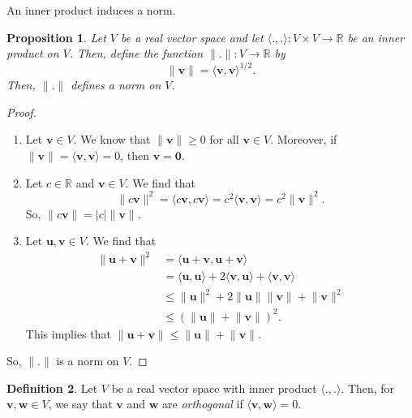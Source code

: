 \documentclass[a4paper, openany]{memoir}
\theoremstyle{definition}
\newtheorem{definition}{Definition}[section]
\theoremstyle{plain}
\newtheorem{proposition}[definition]{Proposition}
\begin{document}
An inner product induces a norm.
\begin{proposition}
    Let $V$ be a real vector space and let $\langle ., . \rangle: V \times V \to \mathbb{R}$ be an inner product on $V$. Then, define the function $\lVert . \rVert: V \to \mathbb{R}$ by 
    \[\lVert \bm{v} \rVert = \langle \bm{v}, \bm{v} \rangle^{1/2}.\]
    Then, $\lVert . \rVert$ defines a norm on $V$.
\end{proposition}
\begin{proof}
    \hspace*{0pt}
    \begin{enumerate}[label=\textbf{N\arabic*.}]
        \item Let $\bm{v} \in V$. We know that $\lVert \bm{v} \rVert \geq 0$ for all $\bm{v} \in V$. Moreover, if $\lVert \bm{v} \rVert = \langle \bm{v}, \bm{v} \rangle = 0$, then $\bm{v} = \bm{0}$.
        \item Let $c \in \mathbb{R}$ and $\bm{v} \in V$. We find that
        \[\lVert c\bm{v} \rVert^2 = \langle c\bm{v}, c\bm{v} \rangle = c^2 \langle \bm{v}, \bm{v} \rangle = c^2 \lVert \bm{v} \rVert^2.\]
        So, $\lVert c\bm{v} \rVert = |c| \lVert \bm{v} \rVert$.
        \item Let $\bm{u}, \bm{v} \in V$. We find that
        \begin{align*}
            \lVert \bm{u} + \bm{v} \rVert^2 &= \langle \bm{u} + \bm{v}, \bm{u} + \bm{v} \rangle \\
            &= \langle \bm{u}, \bm{u} \rangle + 2\langle \bm{v}, \bm{u} \rangle + \langle \bm{v}, \bm{v} \rangle \\
            &\leq \lVert \bm{u} \rVert^2 + 2\lVert \bm{u} \rVert\lVert \bm{v} \rVert + \lVert \bm{v} \rVert^2 \\
            &\leq (\lVert \bm{u} \rVert + \lVert \bm{v} \rVert)^2.
        \end{align*}
        This implies that $\lVert \bm{u} + \bm{v} \rVert \leq \lVert \bm{u} \rVert + \lVert \bm{v} \rVert$.
    \end{enumerate}
    So, $\lVert . \rVert$ is a norm on $V$.
\end{proof}

\begin{definition}
    Let $V$ be a real vector space with inner product $\langle ., . \rangle$. Then, for $\bm{v}, \bm{w} \in V$, we say that $\bm{v}$ and $\bm{w}$ are \emph{orthogonal} if $\langle \bm{v}, \bm{w} \rangle = 0$.
\end{definition}
\end{document}
